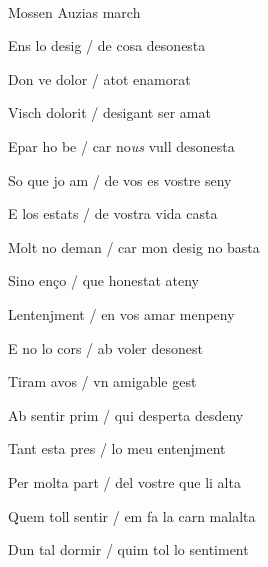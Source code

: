 \documentclass[12pt]{article}
\renewcommand{\espaiAbansEtiquetaPoema}{\vspace{0ex}}
\begin{document}
\begin{estrofa}

\espaiAbansEtiquetaPoema

\\

\begin{rubrica}

\pagina{[59v]} Mossen Auzias march

\end{rubrica}

\end{estrofa}


\begin{estrofa}

 Ens lo desig / de cosa desonesta

 Don ve dolor / atot enamorat

 Visch dolorit / desigant ser amat

 Epar ho be / car no\textit{us} vull desonesta

 So que jo am / de vos es vostre seny

 E los estats / de vostra vida casta

 Molt no deman / car mon desig no basta

 Sino en\c{c}o / que honestat ateny

\end{estrofa}



\begin{estrofa}

 Lentenjment / en vos amar menpeny

 E no lo cors / ab voler desonest

 Tiram avos / vn amigable gest

 Ab sentir prim / qui desperta desdeny

 Tant esta pres / lo meu entenjment

 Per molta part / del vostre que li alta

 Quem toll sentir / em fa la carn malalta

 Dun tal dormir / quim tol lo sentiment

\end{estrofa}
\end{document}
